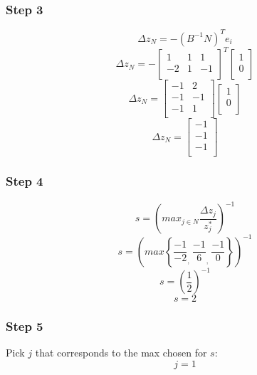 \documentclass[14pt]{extarticle}
\begin{document}
\subsubsection*{Step 3}
\[
    \Delta z_N = -(B^{-1}N)^T e_i
\]
\[
    \Delta z_N =
    -\begin{bmatrix}
        1 & 1 & 1 \\
        -2 & 1 & -1 \\
    \end{bmatrix}^T
    \begin{bmatrix}
        1 \\
        0 \\
    \end{bmatrix}
\]
\[
    \Delta z_N = 
    \begin{bmatrix}
        -1 & 2 \\
        -1 & -1 \\
        -1 & 1 \\
    \end{bmatrix}
    \begin{bmatrix}
        1 \\
        0 \\
    \end{bmatrix}
\]
\[
    \Delta z_N = 
    \begin{bmatrix}
        -1 \\
        -1 \\
        -1 \\
    \end{bmatrix}
\]

\subsubsection*{Step 4}
\[
    s = \left(max_{j \in N} \frac{\Delta z_j}{z^*_j}\right)^{-1}
\]
\[
    s = \left(max \left\{ \frac{-1}{-2}_{\textstyle,}\ \frac{-1}{6}_{\textstyle,}\ \frac{-1}{0} \right\} \right)^{-1}
\]
\[
    s = \left(\frac{1}{2}\right)^{-1}
\]
\[
    s = 2
\]

\subsubsection*{Step 5}
Pick $j$ that corresponds to the max chosen for $s$:
\[
    j = 1
\]
\end{document}
